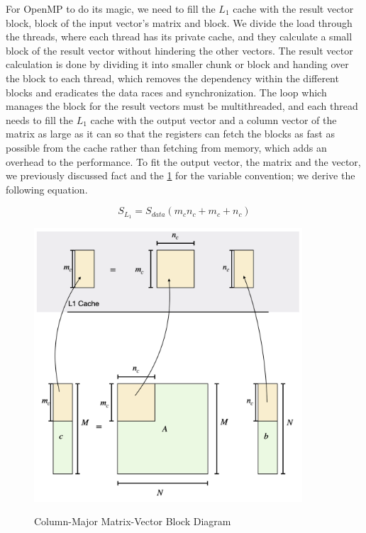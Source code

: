 For OpenMP to do its magic, we need to fill the $L_1$ cache with 
the result vector block, block of the input vector's matrix and block. 
We divide the load through the threads, where each thread has 
its private cache, and they calculate a small block of the 
result vector without hindering the other vectors. 
The result vector calculation is done by dividing it into 
smaller chunk or block and handing over the block to each thread, 
which removes the dependency within the different blocks and 
eradicates the data races and synchronization. 
The loop which manages the block for the result 
vectors must be multithreaded, and each thread needs to fill 
the $L_1$ cache with the output vector and a column vector of the matrix 
as large as it can so that the registers can fetch the blocks as fast 
as possible from the cache rather than fetching from memory, which adds 
an overhead to the performance. To fit the output vector, the matrix and the vector, 
we previously discussed fact and the \ref{fig:mtv_col_block_diagram} 
for the variable convention; we derive the following equation.

\begin{equation}
    S_{L_1} = S_{data}(m_cn_c + m_c + n_c)
    \label{eq:mtv_col_block} 
\end{equation}

\begin{figure}[htb]
    \centering
    \caption{Column-Major Matrix-Vector Block Diagram}
    \includegraphics[width=10cm]{../assets/mtv/col_major/block_diagram.png} %
    \label{fig:mtv_col_block_diagram}
\end{figure}


